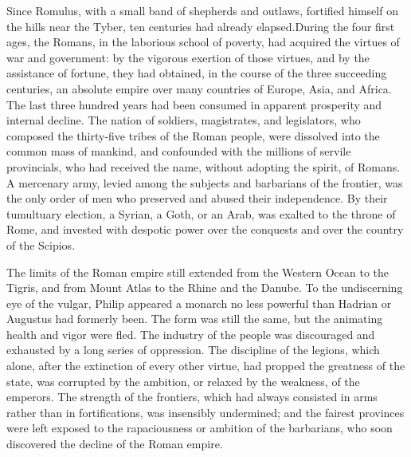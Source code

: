 
Since Romulus, with a small band of shepherds
and outlaws, fortified himself on the hills near the Tyber, ten
centuries had already elapsed.\footnotemark[59] During the four first ages, the
Romans, in the laborious school of poverty, had acquired the
virtues of war and government: by the vigorous exertion of those
virtues, and by the assistance of fortune, they had obtained, in
the course of the three succeeding centuries, an absolute empire
over many countries of Europe, Asia, and Africa. The last three
hundred years had been consumed in apparent prosperity and
internal decline. The nation of soldiers, magistrates, and
legislators, who composed the thirty-five tribes of the Roman
people, were dissolved into the common mass of mankind, and
confounded with the millions of servile provincials, who had
received the name, without adopting the spirit, of Romans. A
mercenary army, levied among the subjects and barbarians of the
frontier, was the only order of men who preserved and abused
their independence. By their tumultuary election, a Syrian, a
Goth, or an Arab, was exalted to the throne of Rome, and invested
with despotic power over the conquests and over the country of
the Scipios.


The limits of the Roman empire still extended from the Western
Ocean to the Tigris, and from Mount Atlas to the Rhine and the
Danube. To the undiscerning eye of the vulgar, Philip appeared a
monarch no less powerful than Hadrian or Augustus had formerly
been. The form was still the same, but the animating health and
vigor were fled. The industry of the people was discouraged and
exhausted by a long series of oppression. The discipline of the
legions, which alone, after the extinction of every other virtue,
had propped the greatness of the state, was corrupted by the
ambition, or relaxed by the weakness, of the emperors. The
strength of the frontiers, which had always consisted in arms
rather than in fortifications, was insensibly undermined; and the
fairest provinces were left exposed to the rapaciousness or
ambition of the barbarians, who soon discovered the decline of
the Roman empire.

